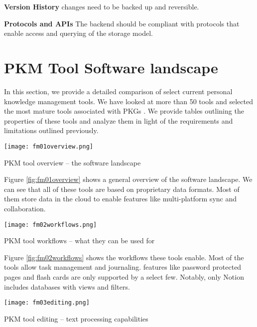 \textbf{Version History} changes need to be backed up and reversible.

\textbf{Protocols and APIs} The backend should be compliant with protocols that enable access and querying of the storage model.







\section{PKM Tool Software landscape}

In this section, we provide a detailed comparison of select current personal knowledge management tools. We have looked at more than 50 tools and selected the most mature tools associated with PKGs \cite{notion, obsidian, roam, logseq, remnote}. We provide tables outlining the properties of these tools and analyze them in light of the requirements and limitations outlined previously.

\begin{table}[H]
    \centering
    \texttt{[image: fm01overview.png]}
    \caption{PKM tool overview -- the software landscape}
    \label{fig:fm01overview}
\end{table}

Figure \ref{fig:fm01overview} shows a general overview of the software landscape. We can see that all of these tools are based on proprietary data formats. Most of them store data in the cloud to enable features like multi-platform sync and collaboration.


\begin{table}[H]
    \centering
    \texttt{[image: fm02workflows.png]}
    \caption{PKM tool workflows -- what they can be used for}
    \label{fig:fm02workflows}
\end{table}

Figure \ref{fig:fm02workflows} shows the workflows these tools enable. Most of the tools allow task management and journaling. features like password protected pages and flash cards are only supported by a select few. Notably, only Notion includes databases with views and filters.

\begin{table}[H]
    \centering
    \texttt{[image: fm03editing.png]}
    \caption{PKM tool editing -- text processing capabilities}
    \label{fig:fm03editing}
\end{table}


